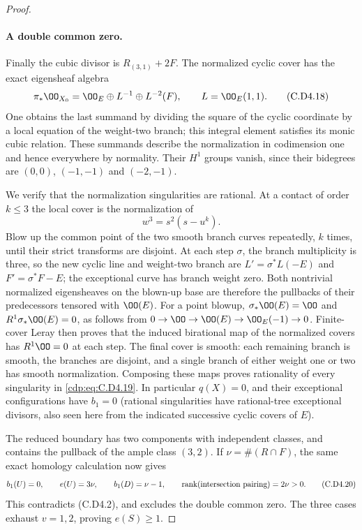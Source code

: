\begin{proof}
\paragraph{A double common zero.}
Finally the cubic divisor is $R_{(3,1)}+2F$. The normalized
cyclic cover has the exact eigensheaf algebra
\[
 \pi_*\OO_{X_0}
       =\OO_E\oplus L^{-1}\oplus L^{-2}(F),
       \qquad L=\OO_E(1,1).
\tag{C.D4.18}\label{cdp:eq:C.D4.18}
\]
One obtains the last summand by dividing the square of the
cyclic coordinate by a local equation of the weight-two
branch; this integral element satisfies its monic cubic
relation. These summands describe the normalization in
codimension one and hence everywhere by normality. Their
$H^1$ groups vanish, since their bidegrees are $(0,0)$,
$(-1,-1)$ and $(-2,-1)$.

We verify that the normalization singularities are rational.
At a contact of order $k\le3$ the local cover is the
normalization of
\[
                            w^3=s^2(s-u^k).
\tag{C.D4.19}\label{cdp:eq:C.D4.19}
\]
Blow up the common point of the two smooth branch curves
repeatedly, $k$ times, until their strict transforms are
disjoint. At each step $\sigma$, the branch multiplicity
is three, so the new cyclic line and weight-two branch
are $L'=\sigma^*L(-E)$ and $F'=\sigma^*F-E$; the exceptional
curve has branch weight zero. Both nontrivial normalized
eigensheaves on the blown-up base are therefore the
pullbacks of their predecessors tensored with $\OO(E)$.
For a point blowup,
$\sigma_*\OO(E)=\OO$ and $R^1\sigma_*\OO(E)=0$, as follows
from $0\to\OO\to\OO(E)\to\OO_E(-1)\to0$.
Finite-cover Leray then proves that the induced birational
map of the normalized covers has $R^1\OO=0$ at each step.
The final cover is smooth: each remaining branch is smooth,
the branches are disjoint, and a single branch of either
weight one or two has smooth normalization. Composing
these maps proves rationality of every singularity in
\eqref{cdp:eq:C.D4.19}. In particular $q(X)=0$, and their exceptional
configurations have $b_1=0$ (rational singularities have
rational-tree exceptional divisors, also seen here from
the indicated successive cyclic covers of $E$).

The reduced boundary has two components with independent
classes, and contains the pullback of the ample class
$(3,2)$. If $\nu=\#(R\cap F)$, the same exact homology
calculation now gives
\[
        b_1(U)=0,\qquad e(U)=3\nu,\qquad
        b_1(D)=\nu-1,\qquad
        \operatorname{rank}(\hbox{intersection pairing})=2\nu>0.
\tag{C.D4.20}\label{cdp:eq:C.D4.20}
\]
This contradicts (C.D4.2), and excludes the double common
zero. The three cases exhaust $v=1,2$, proving $e(S)\ge1$.
\end{proof}


